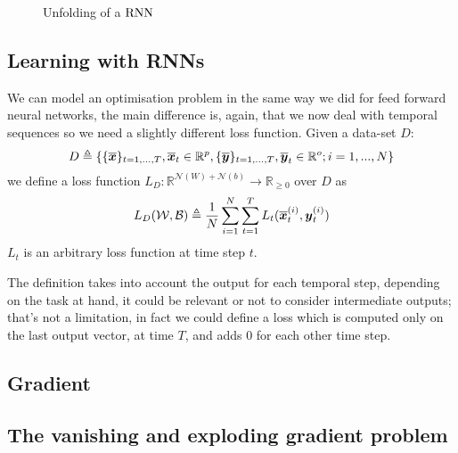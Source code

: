 \begin{figure}[h!]
\caption{Unfolding of a $\mathrm{RNN}$}
\label{rnn_unfolding}
\end{figure}


\subsection{Learning with RNNs}
We can model an optimisation problem in the same way we did for feed forward neural networks, the main difference is, again, that we now deal with temporal sequences so we need a slightly different
loss function.
Given a data-set $D$:
\begin{equation}
D\triangleq\{\{\overline{\boldsymbol{x}}\}_{t=1,...,T}, \overline{\boldsymbol{x}}_t \in \mathbb{R}^p, \{\overline{\boldsymbol{y}}\}_{t=1,...,T}, \overline{\boldsymbol{y}}_t \in \mathbb{R}^o;  i=1,...,N\}
\end{equation}
we define a loss function $L_D:\mathbb{R}^{\mathcal{N}(W)+\mathcal{N}(b)} \rightarrow \mathbb{R}_{\geq 0}$ over $D$  as
\begin{equation}
L_D(\mathcal{W},\mathcal{B})\triangleq\frac{1}{N}\sum_{i=1}^N \sum_{t=1}^T L_t(\overline{\boldsymbol{x}}_t^{(i)},\boldsymbol{y}_t^{(i)}) 
\end{equation}
$L_t$ is an arbitrary loss function at time step $t$.

The definition takes into account the output for each temporal step, depending on the task at hand, it could be relevant or not to consider intermediate
outputs; that's not a limitation, in fact we could define a loss which is computed only on the last output vector, at time $T$, and adds 0 for each
other time step.


\subsection{Gradient}


\subsection{The vanishing and exploding gradient problem}





